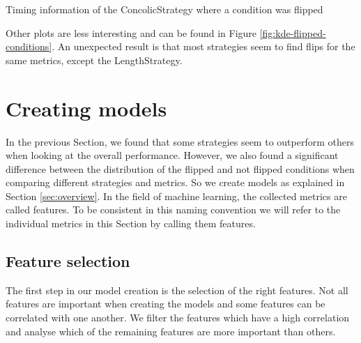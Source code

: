 \begin{table}[H]
\centering

\caption{Timing information of the ConcolicStrategy where a condition was flipped}\label{tab:concolic-info}
\end{table}

Other plots are less interesting and can be found in Figure \ref{fig:kde-flipped-conditions}. An unexpected result is that most strategies seem to find flips for the same metrics, except the LengthStrategy.


\section{Creating models}
In the previous Section, we found that some strategies seem to outperform others when looking at the overall performance. However, we also found a significant difference between the distribution of the flipped and not flipped conditions when comparing different strategies and metrics. So we create models as explained in Section \ref{sec:overview}. In the field of machine learning, the collected metrics are called features. To be consistent in this naming convention we will refer to the individual metrics in this Section by calling them features.

\subsection{Feature selection}
The first step in our model creation is the selection of the right features.
Not all features are important when creating the models and some features can be correlated with one another. We filter the features which have a high correlation and analyse which of the remaining features are more important than others.

